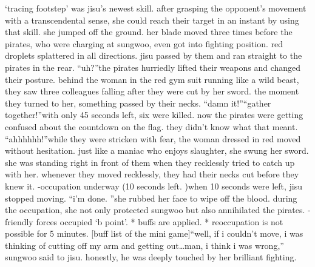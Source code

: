 ‘tracing footstep’ was jisu’s newest skill.
 after grasping the opponent’s movement with a transcendental sense, she could reach their target in an instant by using that skill.
she jumped off the ground.
 her blade moved three times before the pirates, who were charging at sungwoo, even got into fighting position.
 red droplets splattered in all directions.
 jisu passed by them and ran straight to the pirates in the rear.
“uh?”the pirates hurriedly lifted their weapons and changed their posture.
 behind the woman in the red gym suit running like a wild beast, they saw three colleagues falling after they were cut by her sword.
 the moment they turned to her, something passed by their necks.
“damn it!”“gather together!”with only 45 seconds left, six were killed.
 now the pirates were getting confused about the countdown on the flag.
 they didn’t know what that meant.
“ahhhhhh!”while they were stricken with fear, the woman dressed in red moved without hesitation.
just like a maniac who enjoys slaughter, she swung her sword.
she was standing right in front of them when they recklessly tried to catch up with her.
whenever they moved recklessly, they had their necks cut before they knew it.
-occupation underway (10 seconds left.
)when 10 seconds were left, jisu stopped moving.
“i’m done.
”she rubbed her face to wipe off the blood.
 during the occupation, she not only protected sungwoo but also annihilated the pirates.
-friendly forces occupied ‘b point’.
* buffs are applied.
* reoccupation is not possible for 5 minutes.
[buff list of the mini game]“well, if i couldn’t move, i was thinking of cutting off my arm and getting out…man, i think i was wrong,” sungwoo said to jisu.
honestly, he was deeply touched by her brilliant fighting.


 